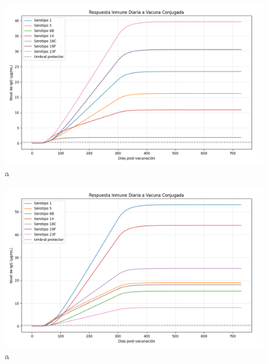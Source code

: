 \begin{figure}[h] %
    \centering
    \includegraphics[width=1\textwidth]{Graphics/res2.png}
    \caption{a}
    \label{fig:etiqueta}
\end{figure}

\begin{figure}[h] %
    \centering
    \includegraphics[width=1\textwidth]{Graphics/res3.png}
    \caption{a}
    \label{fig:etiqueta}
\end{figure}